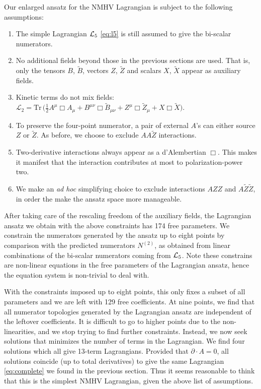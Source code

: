 \documentclass[11pt,a4paper]{article}
\begin{document}
Our enlarged ansatz for the NMHV Lagrangian is subject to the following assumptions:
\begin{enumerate}
\item{The simple Lagrangian ${\cal L}_5$ \eqref{eq:l5} is still assumed to give the bi-scalar numerators.} 
\item{No additional fields beyond those in the previous sections are used. That is, only the  tensors $B$, $\tilde{B}$, vectors $Z$, $\tilde{Z}$ and scalars $X$, $\tilde{X}$ appear as auxiliary fields.}
\item{Kinetic terms do not mix fields: $\mathcal{L}_2 = \text{Tr} \, \Big( \frac{1}{2} A^\mu \Box A_\mu + B^{\mu \nu} \Box \tilde{B}_{\mu \nu} + Z^\mu \Box \tilde{Z}_\mu + X \Box \tilde{X} \Big) $.}
\item To preserve the four-point numerator, a pair of external $A$'s can either source $Z$ or $\tilde{Z}$. As before, we choose to exclude $AA \tilde{Z}$ interactions.
\item{Two-derivative interactions always appear as a d'Alembertian $\Box$. This makes it manifest that the interaction contributes at most to polarization-power two.}
\item{We make an {\it ad hoc} simplifying choice to exclude interactions $AZZ$ and $A \tilde{Z} \tilde{Z}$, in order the make the ansatz space more manageable.}
\end{enumerate}
After taking care of the rescaling freedom of the auxiliary fields, the Lagrangian ansatz we obtain with the above constraints has 174 free parameters. We constrain the numerators generated by the ansatz up to eight points by comparison with the predicted numerators $N^{(2)}$, as obtained from linear combinations of the bi-scalar numerators coming from ${\cal L}_5$. Note these constrains are non-linear equations in the free parameters of the Lagrangian ansatz, hence the equation system is non-trivial to deal with.   

With the constraints imposed up to eight points, this only fixes a subset of all parameters and we are left with 129 free coefficients. At nine points, we find that all numerator topologies generated by the Lagrangian ansatz are independent of the leftover coefficients. It is difficult to go to higher points due to the non-linearities, and we stop trying to find further constraints. Instead, we now seek solutions that minimizes the number of terms in the Lagrangian. We find four solutions which all give 13-term Lagrangians. Provided that $\partial \cdot A =0$, all solutions coincide (up to total derivatives) to give the same Lagrangian \eqref{eq:complete} we found in the previous section. Thus it seems reasonable to think that this is the simplest NMHV Lagrangian, given the above list of assumptions. 
\end{document}
